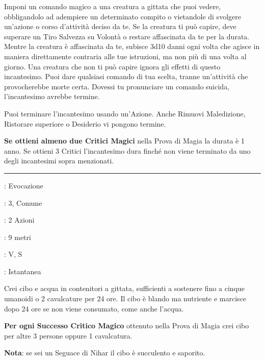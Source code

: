 \begin{multicols}{2}
Imponi un comando magico a una creatura a gittata che puoi vedere, obbligandolo ad adempiere un determinato compito o vietandole di svolgere un'azione o corso d'attività deciso da te. Se la creatura ti può capire, deve superare un Tiro Salvezza su Volontà o restare affascinata da te per la durata. Mentre la creatura è affascinata da te, subisce 3d10 danni ogni volta che agisce in maniera direttamente contraria alle tue istruzioni, ma non più di una volta al giorno. Una creatura che non ti può capire ignora gli effetti di questo incantesimo. Puoi dare qualsiasi comando di tua scelta, tranne un'attività che provocherebbe morte certa. Dovessi tu pronunciare un comando suicida, l'incantesimo avrebbe termine.

Puoi terminare l'incantesimo usando un'Azione. Anche Rimuovi Maledizione, Ristorare superiore o Desiderio vi pongono termine.

\textbf{Se ottieni almeno due Critici Magici} nella Prova di Magia la durata è 1 anno. Se ottieni 3 Critici l'incantesimo dura finché non viene terminato da uno degli incantesimi sopra menzionati.

\smallskip\noindent\rule{\linewidth}{2pt} \hypertarget{Creare Cibo e Acqua}{}\smallskip{}
\noindent
\begin{description}[noitemsep, topsep=0pt, parsep=0pt, partopsep=0pt, leftmargin=0cm, labelwidth=2.8cm]
	\item[\textbf{Lista di Magia}]: Evocazione
	\item[\textbf{Livello}]: 3, Comune
	\item[\textbf{T. di Lancio}]: 2 Azioni
	\item[\textbf{Gittata}]: 9 metri
	\item[\textbf{Componenti}]: V, S
	\item[\textbf{Durata}]: Istantanea
\end{description}

Crei cibo e acqua in contenitori a gittata, sufficienti a sostenere fino a cinque umanoidi o 2 cavalcature per 24 ore. Il cibo è blando ma nutriente e marcisce dopo 24 ore se non viene consumato, come anche l'acqua.

\textbf{Per ogni Successo Critico Magico} ottenuto nella Prova di Magia crei cibo per altre 3 persone oppure 1 cavalcatura.

\textbf{Nota}: se sei un Seguace di Nihar il cibo è succulento e saporito.


\end{multicols}
